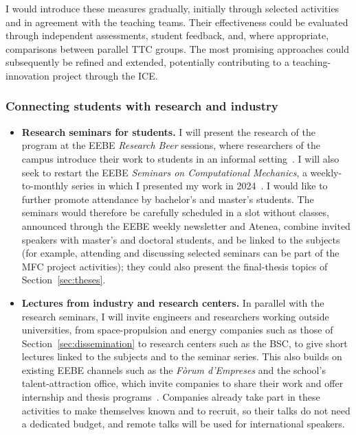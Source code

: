 \documentclass[11pt]{article}
\begin{document}
I would introduce these measures gradually, initially through selected activities and in agreement with the teaching teams. Their effectiveness could be evaluated through independent assessments, student feedback, and, where appropriate, comparisons between parallel TTC groups. The most promising approaches could subsequently be refined and extended, potentially contributing to a teaching-innovation project through the ICE.

\subsubsection{Connecting students with research and industry}\label{sec:connect}
\begin{itemize}
  \item \textbf{Research seminars for students.} 
  I will present the research of the program at the EEBE \emph{Research Beer} sessions, where researchers of the campus introduce their work to students in an informal setting~\cite{ResearchBeer}. 
  I will also seek to restart the EEBE \emph{Seminars on Computational Mechanics}, a weekly-to-monthly series in which I presented my work in 2024~\cite{SeminarsCM2024}.
  I would like to further promote attendance by bachelor's and master's students. 
  The seminars would therefore be carefully scheduled in a slot without classes, announced through the EEBE weekly newsletter and Atenea, combine invited speakers with master's and doctoral students, and be linked to the subjects (for example, attending and discussing selected seminars can be part of the MFC project activities); they could also present the final-thesis topics of Section~\ref{sec:theses}.
  \item \textbf{Lectures from industry and research centers.} 
  In parallel with the research seminars, I will invite engineers and researchers working outside universities, from space-propulsion and energy companies such as those of Section~\ref{sec:dissemination} to research centers such as the BSC, to give short lectures linked to the subjects and to the seminar series. 
  This also builds on existing EEBE channels such as the \textit{F\`orum d'Empreses} and the school's talent-attraction office, which invite companies to share their work and offer internship and thesis programs~\cite{ForumEEBE,TalentEEBE}. 
  Companies already take part in these activities to make themselves known and to recruit, so their talks do not need a dedicated budget, and remote talks will be used for international speakers. 
\end{itemize}
\end{document}

